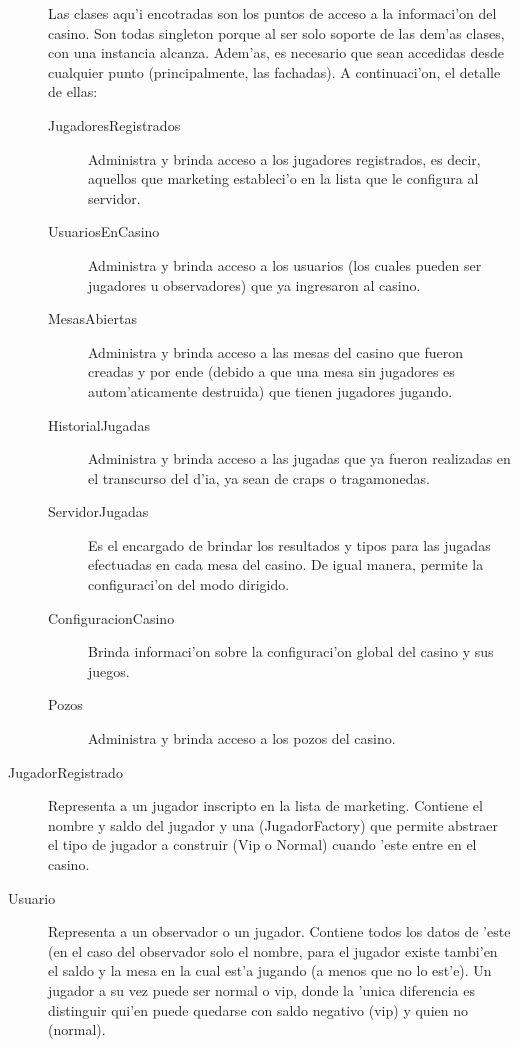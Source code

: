 \begin{description}
\item[] Las clases aqu'i encotradas son los puntos de acceso a la informaci'on del casino. Son todas singleton porque al ser solo soporte de las dem'as clases, con una instancia alcanza. Adem'as, es necesario que sean accedidas desde cualquier punto (principalmente, las fachadas). A continuaci'on, el detalle de ellas:
	\begin{description}
	\item[JugadoresRegistrados] Administra y brinda acceso a los jugadores registrados, es decir, aquellos que marketing estableci'o en la lista que le configura al servidor.
	\item[UsuariosEnCasino] Administra y brinda acceso a los usuarios (los cuales pueden ser jugadores u observadores) que ya ingresaron al casino.
	\item[MesasAbiertas] Administra y brinda acceso a las mesas del casino que fueron creadas y por ende (debido a que una mesa sin jugadores es autom'aticamente destruida) que tienen jugadores jugando.
	\item[HistorialJugadas] Administra y brinda acceso a las jugadas que ya fueron realizadas en el transcurso del d'ia, ya sean de craps o tragamonedas.
	\item[ServidorJugadas] Es el encargado de brindar los resultados y tipos para las jugadas efectuadas en cada mesa del casino. De igual manera, permite la configuraci'on del modo dirigido.
	\item[ConfiguracionCasino] Brinda informaci'on sobre la configuraci'on global del casino y sus juegos.
	\item[Pozos] Administra y brinda acceso a los pozos del casino.
	\end{description}

\item[JugadorRegistrado] Representa a un jugador inscripto en la lista de marketing. Contiene el nombre y saldo del jugador y una  (JugadorFactory) que permite abstraer el tipo de jugador a construir (Vip o Normal) cuando 'este entre en el casino.

\item[Usuario] Representa a un observador o un jugador. Contiene todos los datos de 'este (en el caso del observador solo el nombre, para el jugador existe tambi'en el saldo y la mesa en la cual est'a jugando (a menos que no lo est'e). Un jugador a su vez puede ser normal o vip, donde la 'unica diferencia es distinguir qui'en puede quedarse con saldo negativo (vip) y quien no (normal).


\end{description}
